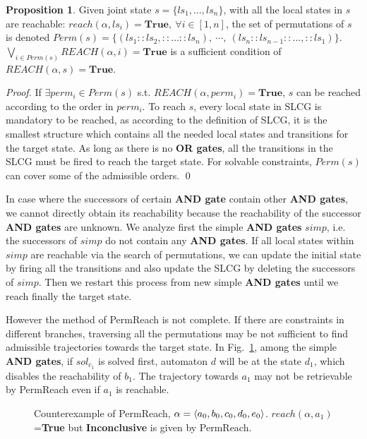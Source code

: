 \documentclass{article}
\theoremstyle{definition}
\newtheorem{proposition}{Proposition}
\DeclarePairedDelimiter{\init}{\langle}{\rangle}
\begin{document}
\begin{proposition}\label{theoperm}
Given joint state $s=\{ls_1,\ldots,ls_n\}$, with all the local states in $s$ are reachable: $reach(\alpha,ls_i)=\mathbf{True},\ \forall i\in[1,n]$, the set of permutations of $s$ is denoted $Perm(s)=\{(ls_1::ls_2,::\ldots ::ls_n),\ \cdots,\ (ls_n::ls_{n-1}::\ldots,::ls_1)\}$. $\bigvee_{i\in Perm(s)} REACH(\alpha,i)=\mathbf{True}$ is a sufficient condition of $REACH(\alpha,s)=\mathbf{True}$.
\end{proposition}
\begin{proof}
If $\exists perm_i\in Perm(s)$ s.t. $REACH(\alpha,perm_i)=\mathbf{True}$, $s$ can be reached according to the order in $perm_i$.
To reach $s$, every local state in SLCG is mandatory to be reached, as according to the definition of SLCG, it is the smallest structure which contains all the needed local states and transitions for the target state. As long as there is no \textbf{OR gates}, all the transitions in the SLCG must be fired to reach the target state.
For solvable constraints, $Perm(s)$ can cover some of the admissible orders.
\qed\end{proof}

In case where the successors of certain \textbf{AND gate} contain other \textbf{AND gates}, we cannot directly obtain its reachability because the reachability of the successor \textbf{AND gates} are unknown.
We analyze first the simple \textbf{AND gates} $simp$, i.e. the successors of $simp$ do not contain any \textbf{AND gates}.
If all local states within $simp$ are reachable via the search of permutations, we can update the initial state by firing all the transitions and also update the SLCG by deleting the successors of $simp$. 
Then we restart this process from new simple \textbf{AND gates} until we reach finally the target state.

However the method of PermReach is not complete. 
If there are constraints in different branches, traversing all the permutations may be not sufficient to find admissible trajectories towards the target state.
In Fig.~\ref{FigConflictInForks}, among the simple \textbf{AND gates}, if $sol_{c_1}$ is solved first, automaton $d$ will be at the state $d_1$, which disables the reachability of $b_1$.
The trajectory towards $a_1$ may not be retrievable by PermReach even if $a_1$ is reachable.
\begin{figure}[ht]
\centering

\caption{Counterexample of PermReach, $\alpha=\init{ a_0,b_0,c_0,d_0,e_0}$. 
$reach(\alpha,a_1)$=\textbf{True} but \textbf{Inconclusive} is given by PermReach.
}\label{FigConflictInForks}
\end{figure}
\end{document}
